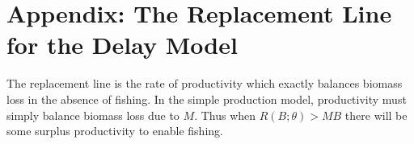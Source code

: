 %
%
%
%

%
\clearpage

%
\section{Appendix\label{delayLine}: The Replacement Line for the Delay Model}

%
The replacement line is the rate of productivity which exactly balances 
biomass loss in the absence of fishing. In the simple production model, %
productivity must simply balance biomass loss due to $M$. Thus when 
$R(B;\theta)>MB$ there will be some surplus productivity to enable 
fishing.    

